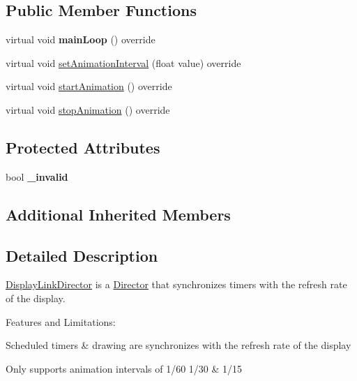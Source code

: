 \subsection*{Public Member Functions}
\begin{DoxyCompactItemize}
\item 
\mbox{\label{classDisplayLinkDirector_a17671ddd0843915d470ea32db207b872}} 
virtual void {\bfseries main\+Loop} () override
\item 
virtual void \hyperlink{classDisplayLinkDirector_ab433b1840297793f0723d673f8efea14}{set\+Animation\+Interval} (float value) override
\item 
virtual void \hyperlink{classDisplayLinkDirector_aed0e316ca8afa0b6e155a5257e3f9201}{start\+Animation} () override
\item 
virtual void \hyperlink{classDisplayLinkDirector_af3c6a2fbc71e733a9957e653c26c7798}{stop\+Animation} () override
\end{DoxyCompactItemize}
\subsection*{Protected Attributes}
\begin{DoxyCompactItemize}
\item 
\mbox{\label{classDisplayLinkDirector_a3f114ebeddbf2ebf275abee05997e974}} 
bool {\bfseries \+\_\+invalid}
\end{DoxyCompactItemize}
\subsection*{Additional Inherited Members}


\subsection{Detailed Description}
\hyperlink{classDisplayLinkDirector}{Display\+Link\+Director} is a \hyperlink{classDirector}{Director} that synchronizes timers with the refresh rate of the display. 

Features and Limitations\+:
\begin{DoxyItemize}
\item Scheduled timers \& drawing are synchronizes with the refresh rate of the display
\item Only supports animation intervals of 1/60 1/30 \& 1/15
\end{DoxyItemize}

